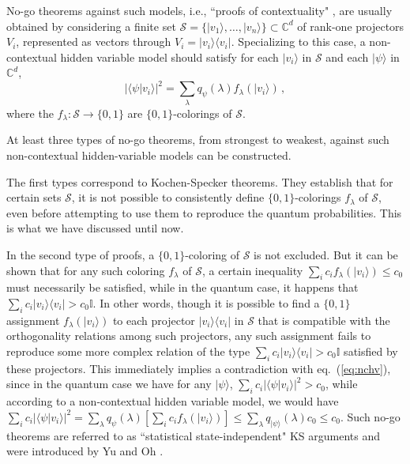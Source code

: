 \documentclass[twocolumn, a4paper, superscriptaddress,nofootinbib, accepted=2020-08-07, hyperref]{quantumarticle}
\begin{document}
No-go theorems against such models, i.e., ``proofs of contextuality" , are usually obtained by considering a finite set $\mathcal{S}=\{|v_1\rangle,\ldots,|v_n\rangle\} \subset \mathbb{C}^d$ of rank-one projectors $V_i$, represented as vectors through $V_i=|v_i\rangle\langle v_i|$. Specializing to this case, a non-contextual hidden variable model should satisfy for each $|v_i\rangle$ in $\mathcal{S}$ and each $|\psi\rangle$ in $\mathbb{C}^d$,
\begin{equation}\label{eq:nchv}
|\langle\psi|v_i\rangle|^2=\sum_\lambda q_{\psi}(\lambda) f_\lambda(|v_i\rangle)\,,
\end{equation}
where the $f_\lambda:\mathcal{S}\rightarrow \{0,1\}$ are $\{0,1\}$-colorings of $\mathcal{S}$.

At least three types of no-go theorems, from strongest to weakest, against such non-contextual hidden-variable models can be constructed.

The first types correspond to Kochen-Specker theorems. They establish that for certain sets $\mathcal{S}$, it is not possible to consistently define $\{0,1\}$-colorings $f_\lambda$ of $\mathcal{S}$, even before attempting to use them to reproduce the quantum probabilities. This is what we have discussed until now. 

In the second type of proofs, a $\{0,1\}$-coloring of $\mathcal{S}$ is not excluded. But it can be shown that for any such coloring $f_\lambda$ of $\mathcal{S}$, a certain inequality  $\sum_i c_i f_\lambda(|v_i\rangle)\leq c_0$ must necessarily be satisfied, while in the quantum case, it happens that $\sum_i c_i |v_i\rangle\langle v_i|>c_0 \mathbb{I}$. In other words, though it is possible to find a $\{0,1\}$ assignment $f_\lambda(|v_i\rangle)$ to each projector $|v_i\rangle\langle v_i|$ in $\mathcal{S}$ that is compatible with the orthogonality relations among such projectors, any such assignment fails to reproduce some more complex relation of the type $\sum_i c_i |v_i\rangle\langle v_i|>c_0 \mathbb{I}$ satisfied by these projectors. This immediately implies a contradiction with eq.~(\ref{eq:nchv}), since in the quantum case we have for any $|\psi\rangle$, $\sum_i c_i |\langle\psi|v_i\rangle|^2>c_0$, while according to a non-contextual hidden variable model, we would have $\sum_i c_i |\langle\psi|v_i\rangle|^2=\sum_\lambda q_{\psi}(\lambda)\left[\sum_i c_i f_\lambda(|v_i\rangle)\right]\leq \sum_\lambda q_{|\psi\rangle}(\lambda)c_0 \leq c_0$. Such no-go theorems are referred to as ``statistical state-independent" KS arguments and were introduced by Yu and Oh \cite{YO12}.
\end{document}
